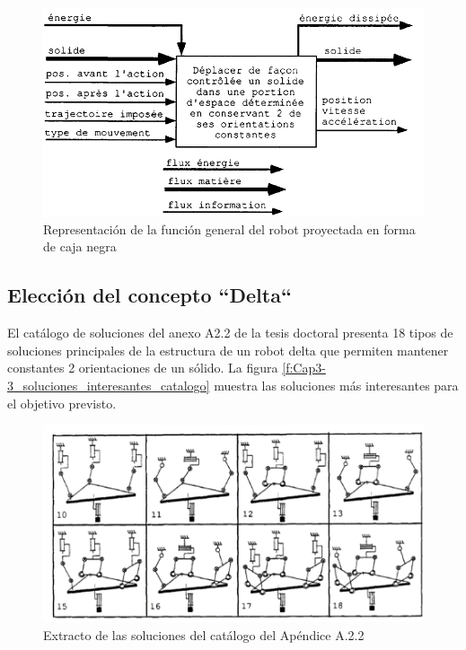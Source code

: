     \begin{figure}[htb]
        \centering
        \includegraphics[width=0.75\linewidth]{Main/Chapter3/Images3/3-3/caja-negra-reymond.png}
        \caption{Representación de la función general del robot proyectada en forma de caja negra \cite{Clavel:31403}}
        \label{f:Cap3-3_caja_negra_reymond}
    \end{figure}
    
    \newpage
    
    \subsection{Elección del concepto ``Delta``}
    El catálogo de soluciones del anexo A2.2 de la tesis doctoral \cite{Clavel:31403} presenta 18 tipos de soluciones principales de la estructura de un robot delta que permiten mantener constantes 2 orientaciones de un sólido. La figura \eqref{f:Cap3-3_soluciones_interesantes_catalogo} muestra las soluciones más interesantes para el objetivo previsto. 

     \begin{figure}[htb]
        \centering
        \includegraphics[width=0.85\linewidth]{Main/Chapter3/Images3/3-3/soluciones-interesantes.png}
        \caption{Extracto de las soluciones del catálogo del Apéndice A.2.2  \cite{Clavel:31403}}
        \label{f:Cap3-3_soluciones_interesantes_catalogo}
    \end{figure}
 
